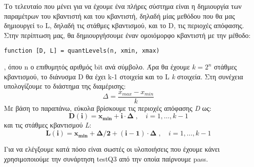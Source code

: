 \par Το τελευταίο που μένει για να έχουμε ένα πλήρες σύστημα είναι η δημιουργία
των παραμέτρων του κβαντιστή και του κβαντιστή, δηλαδή μίας μεθόδου που θα μας δημιουργεί τo L,
δηλαδή τις στάθμες κβαντισμού, και το D, τις περιοχές απόφασης. Στην
περίπτωση μας, θα δημιουργήσουμε έναν ομοιόμορφο κβαντιστή με την μέθοδο:
\begin{lstlisting}[style=myMatlab]
  function [D, L] = quantLevels(n, xmin, xmax)
\end{lstlisting}
, όπου n ο επιθυμητός αριθμός bit ανά σύμβολο. Άρα
θα έχουμε $k = 2^n$ στάθμες κβαντισμού, το διάνυσμα D θα έχει k-1 στοιχεία
και το L \emph{k} στοιχεία. Στη συνέχεια υπολογίζουμε το διάστημα της διαμέρισης:
\begin{equation}
  \label{eq:quant_delta}
  \Delta = \frac{x_{max}-x_{min}}{k}
\end{equation}
Με βάση το παραπάνω, εύκολα βρίσκουμε τις περιοχές απόφασης \emph{D} ως:
\begin{equation}
  \label{eq:quant_regions}
  \bm{\boxed{D(i)=x_{min}+i \cdot \Delta}} \;, \quad i=1, \ldots,k-1
\end{equation}
\noindent και τις στάθμες κβαντισμού \emph{L}:
\begin{equation}
  \label{eq:quant_levels}
  \bm{\boxed{L(i) = x_{min} + \Delta/2 + (i-1)\cdot \Delta}} \; , \quad i=1, \ldots,k-1
\end{equation}

\par Για να ελέγξουμε κατά πόσο είναι σωστές οι υλοποιήσεις που έχουμε κάνει χρησιμοποιούμε
την συνάρτηση testQ3 από την οποία παίρνουμε pass.

